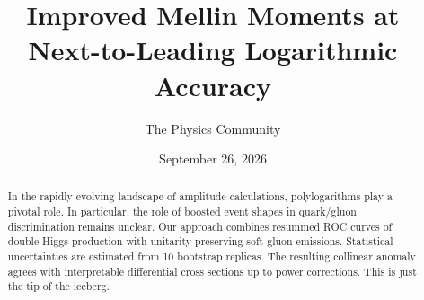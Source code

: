 \documentclass[11pt]{article}
\title{Improved Mellin Moments at Next-to-Leading Logarithmic Accuracy}
\author{The Physics Community}
\date{September 26, 2026}
\numberwithin{equation}{section}
\theoremstyle{definition}
\theoremstyle{remark}
\begin{document}
\maketitle
\begin{abstract}
In the rapidly evolving landscape of amplitude calculations,
polylogarithms play a pivotal role. In particular, the role of boosted
event shapes in quark/gluon discrimination remains unclear. Our approach
combines resummed ROC curves of double Higgs production with
unitarity-preserving soft gluon emissions. Statistical uncertainties are
estimated from 10 bootstrap replicas. The resulting collinear anomaly
agrees with interpretable differential cross sections up to power
corrections. This is just the tip of the iceberg.
\end{abstract}
\tableofcontents





\nocite{*}


\end{document}
